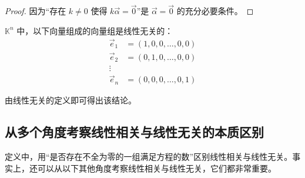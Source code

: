 \begin{proof}
	因为“存在 $k \ne 0$ 使得 $k \vec \alpha = \vec 0$”是 $\vec \alpha = \vec 0$ 的充分必要条件。
\end{proof}

\begin{theorem}
	$\mathbb K^n$ 中，以下向量组成的向量组是线性无关的：
	$$
	\begin{aligned}
		\vec e_1 &= (1, 0, 0, \ldots, 0, 0)
		\\
		\vec e_2 &= (0, 1, 0, \ldots, 0, 0)
		\\
		\vdots
		\\
		\vec e_n &= (0, 0, 0, \ldots, 0, 1)
	\end{aligned}
	$$
\end{theorem}

由线性无关的定义即可得出该结论。

\subsection{从多个角度考察线性相关与线性无关的本质区别}

定义中，用“是否存在不全为零的一组满足方程的数”区别线性相关与线性无关。事实上，还可以从以下其他角度考察线性相关与线性无关，它们都非常重要。